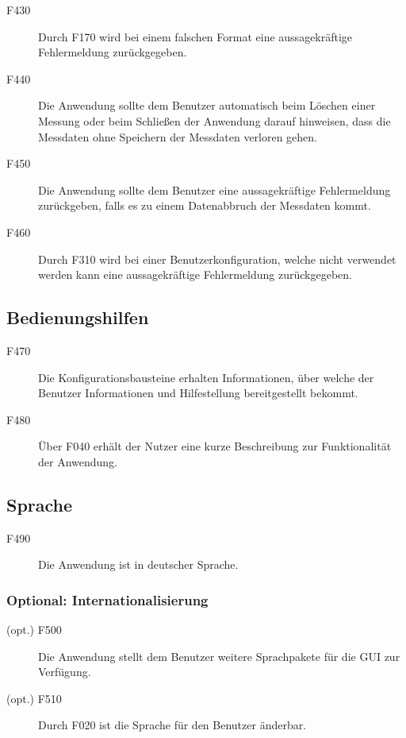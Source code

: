 \documentclass[parskip=full]{scrartcl}
\begin{document}
\begin{description}
\item[F430] Durch F170 wird bei einem falschen Format eine aussagekräftige Fehlermeldung zurückgegeben.
\item[F440] Die Anwendung sollte dem Benutzer automatisch beim Löschen einer Messung oder beim Schließen der Anwendung darauf hinweisen, dass die Messdaten ohne Speichern der Messdaten verloren gehen.
\item[F450] Die Anwendung sollte dem Benutzer eine aussagekräftige Fehlermeldung zurückgeben, falls es zu einem Datenabbruch der Messdaten kommt.
\item[F460] Durch F310 wird bei einer \gls{Benutzerkonfiguration}, welche nicht verwendet werden kann eine aussagekräftige Fehlermeldung zurückgegeben.

\end{description}

\subsection{Bedienungshilfen}

\begin{description}

\item[F470] Die Konfigurationsbausteine erhalten Informationen, über welche der Benutzer Informationen und Hilfestellung bereitgestellt bekommt.
\item[F480] Über F040 erhält der Nutzer eine kurze Beschreibung zur Funktionalität der Anwendung.

\end{description}

\subsection{Sprache}

\begin{description}

\item[F490] Die Anwendung ist in deutscher Sprache.

\end{description}

\subsubsection{Optional: Internationalisierung}

\begin{description}

\item[(opt.) F500] Die Anwendung stellt dem Benutzer weitere Sprachpakete für die \gls{GUI} zur Verfügung.
\item[(opt.) F510] Durch F020 ist die Sprache für den Benutzer änderbar.

\end{description}
\end{document}
